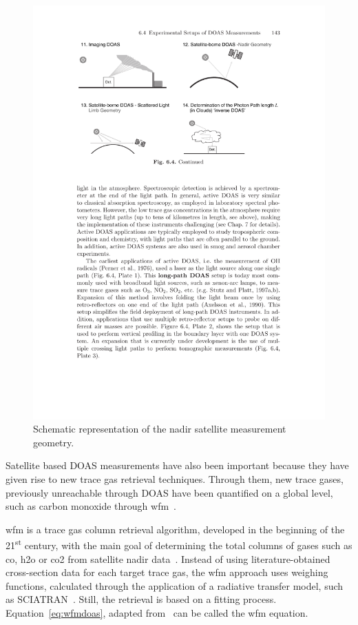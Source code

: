 \begin{description}
        \begin{figure}[htpb]
            \centering
            \includegraphics[trim=10cm 23.7cm 5cm
            3cm, clip, width=\textwidth]{img/pdf/imaging.pdf}
            \caption{Schematic representation of the nadir satellite
            measurement geometry.}
            \label{fig:nadir}
        \end{figure}
\end{description}

Satellite based \gls{DOAS} measurements have also been important because
they have given rise to new trace gas retrieval techniques. Through
them, new trace gases, previously unreachable through \gls{DOAS} have
been quantified on a global level, such as carbon monoxide through
\gls{wfm}~\cite{Buchwitz2000, Buchwitz2004}.

\gls{wfm} is a trace gas column retrieval algorithm, developed in the
beginning of the 21\textsuperscript{st} century, with the main goal of
determining the total columns of gases such as \gls{co}, \gls{h2o} or
\gls{co2} from satellite nadir data~\cite{Buchwitz2004}. Instead of
using literature-obtained cross-section data for each target trace gas,
the \gls{wfm} approach uses weighing functions, calculated through the
application of a radiative transfer model, such as
SCIATRAN~\cite{Rozanov2002}. Still, the retrieval is based on a
fitting process. Equation~\ref{eq:wfmdoas}, adapted
from~\cite{Buchwitz2000, Buchwitz2004} can be called the \gls{wfm}
equation.

